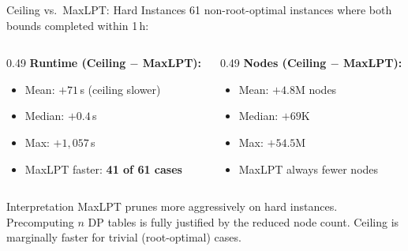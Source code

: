 \documentclass[fleqn,11pt,aspectratio=43]{beamer}
\begin{document}
\begin{frame}[shrink=5]{Ceiling vs.\ MaxLPT: Hard Instances}
  61 non-root-optimal instances where both bounds completed within 1\,h:
  \begin{columns}[T]
    \begin{column}{0.49\textwidth}
      \textbf{Runtime (Ceiling $-$ MaxLPT):}
      \begin{itemize}
        \item Mean: $+71$\,s (ceiling slower)
        \item Median: $+0.4$\,s
        \item Max: $+1{,}057$\,s
        \item MaxLPT faster: \textbf{41 of 61 cases}
      \end{itemize}
    \end{column}
    \begin{column}{0.49\textwidth}
      \textbf{Nodes (Ceiling $-$ MaxLPT):}
      \begin{itemize}
        \item Mean: $+4.8$M nodes
        \item Median: $+69$K
        \item Max: $+54.5$M
        \item MaxLPT always fewer nodes
      \end{itemize}
    \end{column}
  \end{columns}
  \begin{block}{Interpretation}
    \small MaxLPT prunes more aggressively on hard instances.
    Precomputing $n$ DP tables is fully justified by the reduced node count.
    Ceiling is marginally faster for trivial (root-optimal) cases.
  \end{block}
\end{frame}
\end{document}
